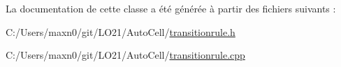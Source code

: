 La documentation de cette classe a été générée à partir des fichiers suivants \+:\begin{DoxyCompactItemize}
\item 
C\+:/\+Users/maxn0/git/\+L\+O21/\+Auto\+Cell/\mbox{\hyperlink{transitionrule_8h}{transitionrule.\+h}}\item 
C\+:/\+Users/maxn0/git/\+L\+O21/\+Auto\+Cell/\mbox{\hyperlink{transitionrule_8cpp}{transitionrule.\+cpp}}\end{DoxyCompactItemize}
